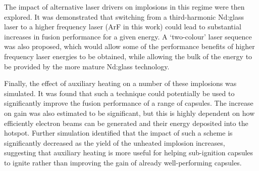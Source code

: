 The impact of alternative laser drivers on implosions in this regime were then explored. It was demonstrated that switching from a third-harmonic Nd:glass laser to a higher frequency laser (ArF in this work) could lead to substantial increases in fusion performance for a given energy. A `two-colour' laser sequence was also proposed, which would allow some of the performance benefits of higher frequency laser energies to be obtained, while allowing the bulk of the energy to be provided by the more mature Nd:glass technology.

Finally, the effect of auxiliary heating on a number of these implosions was simulated. It was found that such a technique could potentially be used to significantly improve the fusion performance of a range of capsules. The increase on gain was also estimated to be significant, but this is highly dependent on how efficiently electron beams can be generated and their energy deposited into the hotspot. Further simulation identified that the impact of such a scheme is significantly decreased as the yield of the unheated implosion increases, suggesting that auxiliary heating is more useful for helping sub-ignition capsules to ignite rather than improving the gain of already well-performing capsules. 





